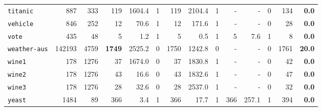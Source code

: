 \begin{tabular}{lccrrrrrrrrrrr}
\texttt{titanic} & \multicolumn{1}{r}{887} & \multicolumn{1}{r}{333}  & 119 & 1604.4 & 1 & 119 & 2104.4 & 1 & - & - & 0 & 134 & \textbf{0.0}\\
\texttt{vehicle} & \multicolumn{1}{r}{846} & \multicolumn{1}{r}{252}  & 12 & 70.6 & 1 & 12 & 171.6 & 1 & - & - & 0 & 28 & \textbf{0.0}\\
\texttt{vote} & \multicolumn{1}{r}{435} & \multicolumn{1}{r}{48}  & 5 & 1.2 & 1 & 5 & 0.5 & 1 & 5 & 7.6 & 1 & 8 & \textbf{0.0}\\
\texttt{weather-aus} & \multicolumn{1}{r}{142193} & \multicolumn{1}{r}{4759}  & \textbf{1749} & 2525.2 & 0 & 1750 & 1242.8 & 0 & - & - & 0 & 1761 & \textbf{20.0}\\
\texttt{wine1} & \multicolumn{1}{r}{178} & \multicolumn{1}{r}{1276}  & 37 & 1674.0 & 0 & 37 & 1830.8 & 1 & - & - & 0 & 42 & \textbf{0.0}\\
\texttt{wine2} & \multicolumn{1}{r}{178} & \multicolumn{1}{r}{1276}  & 43 & 16.6 & 0 & 43 & 1832.6 & 1 & - & - & 0 & 47 & \textbf{0.0}\\
\texttt{wine3} & \multicolumn{1}{r}{178} & \multicolumn{1}{r}{1276}  & 28 & 32.6 & 0 & 28 & 2537.0 & 1 & - & - & 0 & 32 & \textbf{0.0}\\
\texttt{yeast} & \multicolumn{1}{r}{1484} & \multicolumn{1}{r}{89}  & 366 & 3.4 & 1 & 366 & 17.7 & 1 & 366 & 257.1 & 1 & 394 & \textbf{0.0}\\
\bottomrule
\end{tabular}
